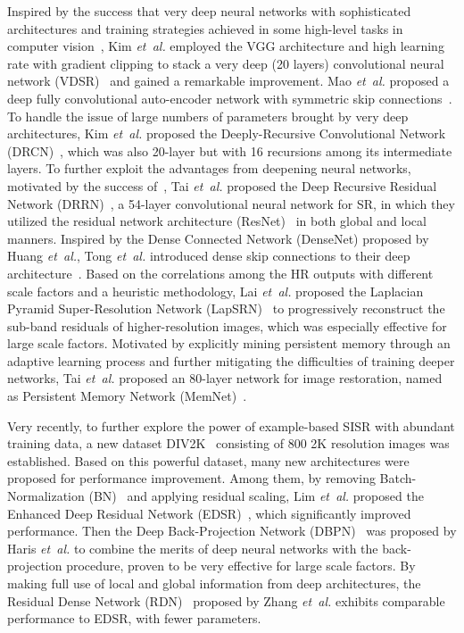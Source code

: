 \documentclass[journal]{IEEEtran}
\begin{document}
Inspired by the success that very deep neural networks with sophisticated architectures and training strategies achieved in some high-level tasks in computer vision~\cite{simonyan2014very}, Kim \emph{et~al.} employed the VGG architecture and high learning rate with gradient clipping to stack a very deep (20 layers) convolutional neural network (VDSR)~\cite{kim2016accurate} and gained a remarkable improvement. Mao \emph{et~al.} proposed a deep fully convolutional auto-encoder network with symmetric skip connections~\cite{mao2016image}. To handle the issue of large numbers of parameters brought by very deep architectures, Kim \emph{et~al.} proposed the Deeply-Recursive Convolutional Network (DRCN)~\cite{kim2016deeply}, which was also 20-layer but with 16 recursions among its intermediate layers. To further exploit the advantages from deepening neural networks, motivated by the success of~\cite{he2016deep}, Tai \emph{et~al.} proposed the Deep Recursive Residual Network (DRRN)~\cite{tai2017image}, a 54-layer convolutional neural network for SR, in which they utilized the residual network architecture (ResNet)~\cite{he2016identity} in both global and local manners. Inspired by the Dense Connected Network (DenseNet) \cite{huang2017densely} proposed by Huang \emph{et~al.}, Tong \emph{et~al.} introduced dense skip connections to their deep architecture~\cite{tong2017image}. Based on the correlations among the HR outputs with different scale factors and a heuristic methodology, Lai \emph{et~al.} proposed the Laplacian Pyramid Super-Resolution Network (LapSRN)~\cite{LapSRN} to progressively reconstruct the sub-band residuals of higher-resolution images, which was especially effective for large scale factors. Motivated by explicitly mining persistent memory through an adaptive learning process and further mitigating the difficulties of training deeper networks, Tai \emph{et~al.} proposed an 80-layer network for image restoration, named as Persistent Memory Network (MemNet)~\cite{Tai-MemNet-2017}. 

Very recently, to further explore the power of example-based SISR with abundant training data, a new dataset DIV2K~\cite{Agustsson_2017_CVPR_Workshops} consisting of 800 2K resolution images was established. Based on this powerful dataset, many new architectures were proposed for performance improvement. Among them, by removing Batch-Normalization (BN)~\cite{ioffe2015batch} and applying residual scaling, Lim \emph{et~al.} proposed the Enhanced Deep Residual Network (EDSR)~\cite{lim2017enhanced}, which significantly improved performance. Then the Deep Back-Projection Network (DBPN)~\cite{haris2018deep} was proposed by Haris \emph{et~al.} to combine the merits of deep neural networks with the back-projection procedure, proven to be very effective for large scale factors. By making full use of local and global information from deep architectures, the Residual Dense Network (RDN)~\cite{zhang2018residual} proposed by Zhang \emph{et~al.} exhibits comparable performance to EDSR, with fewer parameters.   
\end{document}
